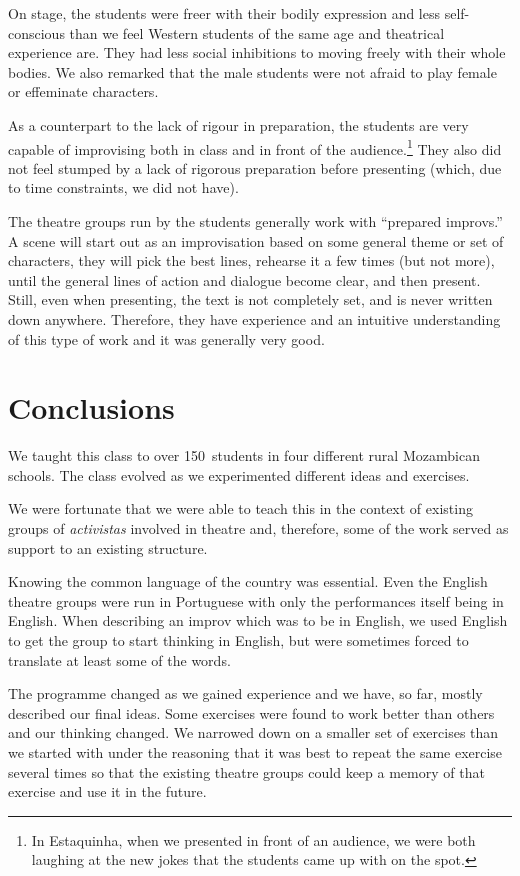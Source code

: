 \documentclass[article,twocolumn,twoside]{memoir}
\begin{document}
On stage, the students were freer with their bodily expression and less
self-conscious than we feel Western students of the same age and theatrical
experience are. They had less social inhibitions to moving freely with their
whole bodies. We also remarked that the male students were not afraid to play
female or effeminate characters.

As a counterpart to the lack of rigour in preparation, the students are
very capable of improvising both in class and in front of the
audience.\footnote{In Estaquinha, when we presented in front of an audience, we
were both laughing at the new jokes that the students came up with on the
spot.} They also did not feel stumped by a lack of rigorous preparation before
presenting (which, due to time constraints, we did not have).

The theatre groups run by the students generally work with ``prepared
improvs.'' A scene will start out as an improvisation based on some general
theme or set of characters, they will pick the best lines, rehearse it a few
times (but not more), until the general lines of action and dialogue become
clear, and then present. Still, even when presenting, the text is not
completely set, and is never written down anywhere. Therefore, they have
experience and an intuitive understanding of this type of work and it was
generally very good.

\chapter{Conclusions}

We taught this class to over 150~students in four different rural Mozambican
schools. The class evolved as we experimented different ideas and exercises.

We were fortunate that we were able to teach this in the context of existing
groups of \textit{activistas} involved in theatre and, therefore, some of the
work served as support to an existing structure.

Knowing the common language of the country was essential. Even the English
theatre groups were run in Portuguese with only the performances itself being
in English. When describing an improv which was to be in English, we used
English to get the group to start thinking in English, but were sometimes
forced to translate at least some of the words.

The programme changed as we gained experience and we have, so far, mostly
described our final ideas. Some exercises were found to work better than others
and our thinking changed. We narrowed down on a smaller set of exercises than
we started with under the reasoning that it was best to repeat the same
exercise several times so that the existing theatre groups could keep a memory
of that exercise and use it in the future.
\end{document}
